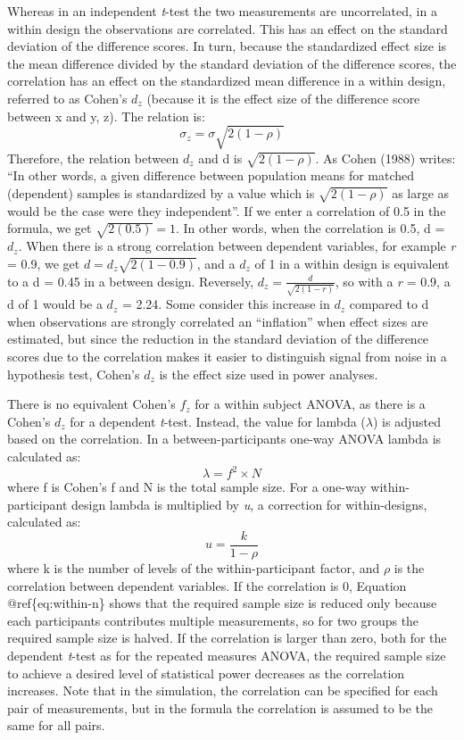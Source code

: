 \documentclass[,jou, draftfirst, a4paper,floatsintext]{apa6}
\begin{document}
Whereas in an independent \emph{t}-test the two measurements are uncorrelated, in a within design the observations are correlated.
This has an effect on the standard deviation of the difference scores.
In turn, because the standardized effect size is the mean difference divided by the standard deviation of the difference scores, the correlation has an effect on the standardized mean difference in a within design, referred to as Cohen's \(d_z\) (because it is the effect size of the difference score between x and y, z). The relation is:
\begin{equation}
\sigma_{z}=\sigma\sqrt{2(1-\rho)}
\end{equation}
Therefore, the relation between \(d_z\) and d is \(\sqrt{2(1-\rho)}\).
As Cohen (1988) writes: \enquote{In other words, a given difference between population means for matched (dependent) samples is standardized by a value which is \(\sqrt{2(1-\rho)}\) as large as would be the case were they independent}.
If we enter a correlation of 0.5 in the formula, we get \(\sqrt{2(0.5)}=1\).
In other words, when the correlation is 0.5, d = \(d_z\). When there is a strong correlation between dependent variables, for example \emph{r} = 0.9, we get \(d=d_{z}\sqrt{2(1-0.9)}\), and a \(d_z\) of 1 in a within design is equivalent to a d = 0.45 in a between design.
Reversely, \(d_{z}=\frac{d}{\sqrt{2(1-r)}}\), so with a \emph{r} = 0.9, a d of 1 would be a \(d_z\) = 2.24.
Some consider this increase in \(d_z\) compared to d when observations are strongly correlated an \enquote{inflation} when effect sizes are estimated, but since the reduction in the standard deviation of the difference scores due to the correlation makes it easier to distinguish signal from noise in a hypothesis test, Cohen's \(d_z\) is the effect size used in power analyses.

There is no equivalent Cohen's \(f_z\) for a within subject ANOVA, as there is a Cohen's \(d_z\) for a dependent \emph{t}-test. Instead, the value for lambda (\(\lambda\)) is adjusted based on the correlation. In a between-participants one-way ANOVA lambda is calculated as:
\begin{equation}
\lambda = f^2 \times N
\end{equation}
where f is Cohen's f and N is the total sample size. For a one-way within-participant design lambda is multiplied by \emph{u}, a correction for within-designs, calculated as:
\begin{equation}
u = \frac{k}{1-\rho}
\end{equation}
where k is the number of levels of the within-participant factor, and \(\rho\) is the correlation between dependent variables.
If the correlation is 0, Equation @ref\{eq:within-n\} shows that the required sample size is reduced only because each participants contributes multiple measurements, so for two groups the required sample size is halved.
If the correlation is larger than zero, both for the dependent \emph{t}-test as for the repeated measures ANOVA, the required sample size to achieve a desired level of statistical power decreases as the correlation increases.
Note that in the simulation, the correlation can be specified for each pair of measurements, but in the formula the correlation is assumed to be the same for all pairs.
\end{document}
